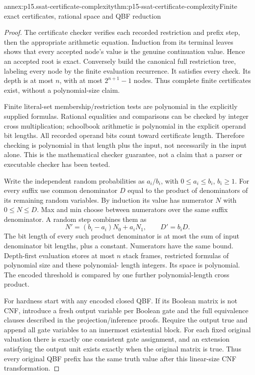 \begin{annexitem}{annex:p15.ssat-certificate-complexity}{thm:p15-ssat-certificate-complexity}{Finite exact certificates, rational space and QBF reduction}
\begin{proof}
The certificate checker verifies each recorded restriction and prefix
step, then the appropriate arithmetic equation. Induction from its
terminal leaves shows that every accepted node's value is the genuine
continuation value. Hence an accepted root is exact. Conversely build
the canonical full restriction tree, labeling every node by the
finite evaluation recurrence. It satisfies every check. Its depth is
at most \(n\), with at most \(2^{n+1}-1\) nodes. Thus complete
finite certificates exist, without a polynomial-size claim.

Finite literal-set membership/restriction tests are polynomial in
the explicitly supplied formulas. Rational equalities and comparisons
can be checked by integer cross multiplication; schoolbook arithmetic
is polynomial in the explicit operand bit lengths. All recorded
operand bits count toward certificate length. Therefore checking is
polynomial in that length plus the input, not necessarily in the input
alone. This is the mathematical checker guarantee, not a claim that
a parser or executable checker has been tested.

Write the independent random probabilities as \(a_i/b_i\),
with \(0\leq a_i\leq b_i\), \(b_i\geq1\). For every suffix
use common denominator \(D\) equal to the product of denominators
of its remaining random variables. By induction its value has numerator
\(N\) with \(0\leq N\leq D\). Max and min choose between
numerators over the same suffix denominator. A random step combines
them as
\[
 N'=(b_i-a_i)N_0+a_iN_1,
 \qquad D'=b_iD.
\]
The bit length of every such product denominator is at most the sum
of input denominator bit lengths, plus a constant. Numerators have
the same bound. Depth-first evaluation stores at most \(n\) stack
frames, restricted formulas of polynomial size and these polynomial-
length integers. Its space is polynomial. The encoded threshold is
compared by one further polynomial-length cross product.

For hardness start with any encoded closed QBF. If its Boolean matrix
is not CNF, introduce a fresh output variable per Boolean gate and
the full equivalence clauses described in the projection/inference
proofs. Require the output true and append all gate variables to an
innermost existential block. For each fixed original valuation there
is exactly one consistent gate assignment, and an extension satisfying
the output unit exists exactly when the original matrix is true.
Thus every original QBF prefix has the same truth value after this
linear-size CNF transformation.


\end{proof}
\end{annexitem}
